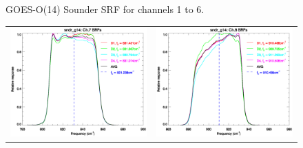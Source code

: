 \begin{figure}[htp]
\begin{tabular}{c c}
  \end{tabular}
  \caption{GOES-O(14) Sounder SRF for channels 1 to 6.}
  \label{fig:sndr_g14.ch1-6}
\end{figure}

\begin{figure}[htp]
  \centering
  \begin{tabular}{c c}
    \includegraphics[scale=0.5]{graphics/nominal/sndr_g14.ch7.srf.eps} &
    \includegraphics[scale=0.5]{graphics/nominal/sndr_g14.ch8.srf.eps} \\

\end{tabular}
\end{figure}
